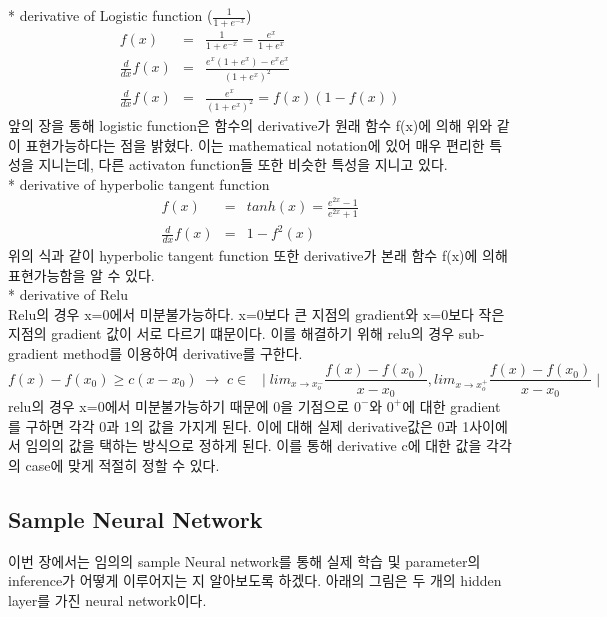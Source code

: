 \documentclass[draft=false]{oblivoir}
\begin{document}
* derivative of Logistic function ($\frac{1}{1+e^{-x}}$)
\begin{eqnarray}
f(x) & = &  \frac{1}{1+e^{-x}} = \frac{e^{x}}{1+e^{x}}\\ 
\frac{d}{dx}f(x) & = & \frac{e^{x}(1+e^{x})-e^{x}e^{x}}{(1+e^{x})^{2}}\\
\frac{d}{dx}f(x) & = & \frac{e^{x}}{(1+e^{x})^{2}} = f(x)(1-f(x))
\end{eqnarray}
앞의 장을 통해 logistic function은 함수의 derivative가 원래 함수 f(x)에 의해 위와 같이 표현가능하다는 점을 밝혔다. 이는 mathematical notation에 있어 매우 편리한 특성을 지니는데, 다른 activaton function들 또한 비슷한 특성을 지니고 있다.\\

* derivative of hyperbolic tangent function
\begin{eqnarray}
f(x) & = &  tanh(x) = \frac{e^{2x}-1}{e^{2x}+1}\\
\frac{d}{dx}f(x) & = & 1 - f^{2}(x)
\end{eqnarray}
위의 식과 같이 hyperbolic tangent function 또한 derivative가 본래 함수 f(x)에 의해 표현가능함을 알 수 있다. \\

* derivative of Relu\\
Relu의 경우 x=0에서 미분불가능하다. x=0보다 큰 지점의 gradient와 x=0보다 작은 지점의 gradient 값이 서로 다르기 떄문이다. 이를 해결하기 위해 relu의 경우 sub-gradient method를 이용하여 derivative를 구한다.
\begin{equation}
f(x) - f(x_{0}) \geq c(x-x_{0}) \; \rightarrow \; c \in  \;\;\mid lim_{x \rightarrow x^{-}_{o}}\frac{f(x)-f(x_{0})}{x-x_{0}}, lim_{x \rightarrow x^{+}_{o}}\frac{f(x)-f(x_{0})}{x-x_{0}} \mid \nonumber
\end{equation}
relu의 경우 x=0에서 미분불가능하기 때문에 0을  기점으로 $0^{-}$와 $0^{+}$에 대한 gradient를 구하면 각각 0과 1의 값을 가지게 된다. 이에 대해 실제 derivative값은 0과 1사이에서 임의의 값을 택하는 방식으로 정하게 된다. 이를 통해 derivative c에 대한 값을 각각의 case에 맞게 적절히 정할 수 있다. 

\subsection{Sample Neural Network}
이번 장에서는 임의의 sample Neural network를 통해 실제 학습 및 parameter의 inference가 어떻게 이루어지는 지 알아보도록 하겠다. 아래의 그림은 두 개의 hidden layer를 가진 neural network이다. 
\end{document}
